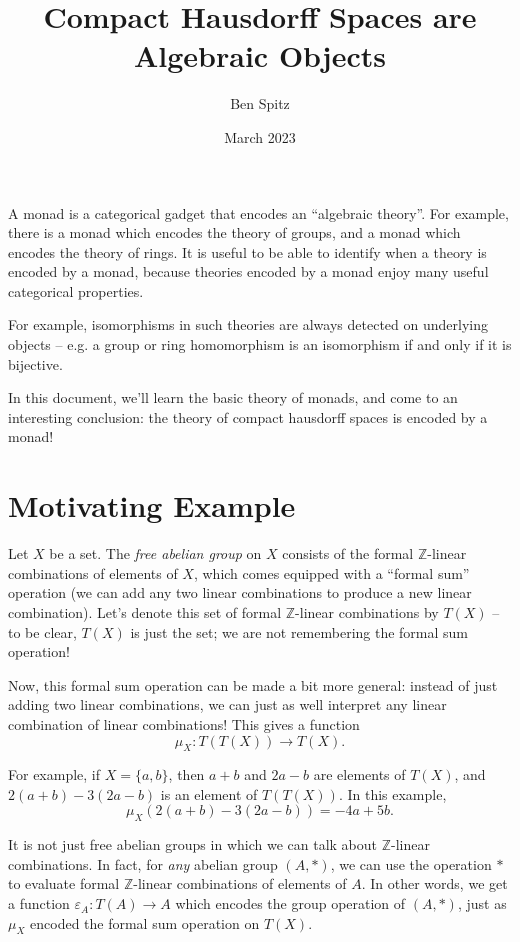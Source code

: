 \documentclass{article}
\title{Compact Hausdorff Spaces are Algebraic Objects}
\author{Ben Spitz}
\date{March 2023}
\theoremstyle{definition}
\newcommand{\ZZ}{\mathbb{Z}}
\begin{document}
\maketitle

A monad is a categorical gadget that encodes an ``algebraic theory''. For example, there is a monad which encodes the theory of groups, and a monad which encodes the theory of rings. It is useful to be able to identify when a theory is encoded by a monad, because theories encoded by a monad enjoy many useful categorical properties.

For example, isomorphisms in such theories are always detected on underlying objects -- e.g. a group or ring homomorphism is an isomorphism if and only if it is bijective.

In this document, we'll learn the basic theory of monads, and come to an interesting conclusion: the theory of compact hausdorff spaces is encoded by a monad!

\section{Motivating Example}

Let $X$ be a set. The \emph{free abelian group} on $X$ consists of the formal $\ZZ$-linear combinations of elements of $X$, which comes equipped with a ``formal sum'' operation (we can add any two linear combinations to produce a new linear combination). Let's denote this set of formal $\ZZ$-linear combinations by $T(X)$ -- to be clear, $T(X)$ is just the set; we are not remembering the formal sum operation!

Now, this formal sum operation can be made a bit more general: instead of just adding two linear combinations, we can just as well interpret any linear combination of linear combinations! This gives a function
\[\mu_X : T(T(X)) \to T(X).\]

For example, if $X = \{a,b\}$, then $a+b$ and $2a-b$ are elements of $T(X)$, and $2(a+b)-3(2a-b)$ is an element of $T(T(X))$. In this example, $$\mu_X(2(a+b)-3(2a-b)) = -4a+5b.$$

It is not just free abelian groups in which we can talk about $\ZZ$-linear combinations. In fact, for \emph{any} abelian group $(A,*)$, we can use the operation $*$ to evaluate formal $\ZZ$-linear combinations of elements of $A$. In other words, we get a function $\varepsilon_A : T(A) \to A$ which encodes the group operation of $(A,*)$, just as $\mu_X$ encoded the formal sum operation on $T(X)$.
\end{document}
